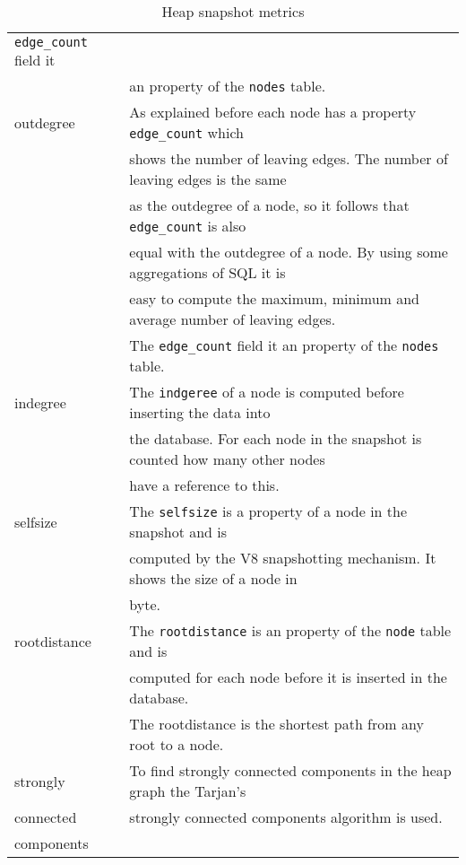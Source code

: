 \begin{table}[!htbp]
\begin{tabular}{|l||l|}
						  \texttt{edge\_count} field it 			\\
						& an property of the \texttt{nodes} table.	\\ \hline
		outdegree		& As explained before each node has a 
						  property \texttt{edge\_count} which 		\\
						& shows the number of leaving edges. 
						  The number of leaving edges is the same 	\\
						& as the outdegree of a node, so it follows 
						  that \texttt{edge\_count} is also 		\\
						& equal with the outdegree of a node. By 
						  using some aggregations of SQL it is 		\\
						& easy to compute the maximum, minimum and 
						  average number of leaving edges. 			\\
						& The \texttt{edge\_count} field it an 
						  property of the \texttt{nodes} table.		\\ \hline
		indegree		& The \texttt{indgeree} of a node is 
						  computed before inserting the data into	\\
						& the database. For each node in the 
						  snapshot is counted how many other nodes	\\
						& have a reference to this.					\\ \hline
		selfsize		& The \texttt{selfsize} is a property of a 
						  node in the snapshot and is 				\\
						& computed by the V8 snapshotting mechanism. 
						   It shows the size of a node in			\\
						& byte.										\\ \hline 
		rootdistance	& The \texttt{rootdistance} is an property 
						  of the \texttt{node} table and is 		\\
						& computed for each node before it is 
						  inserted in the database. 				\\
						& The rootdistance is the shortest path from 
						   any root to a node.						\\ \hline
		strongly		& To find strongly connected components in 
						  the heap graph the Tarjan's 				\\ 
		connected		& strongly connected components
			 			  algorithm\cite{Trajan} is used.			\\
		components		&											\\ \hline
	\end{tabular}
	\caption{Heap snapshot metrics}
	\label{tap:heap_snapshot_metrics}
\end{table}

